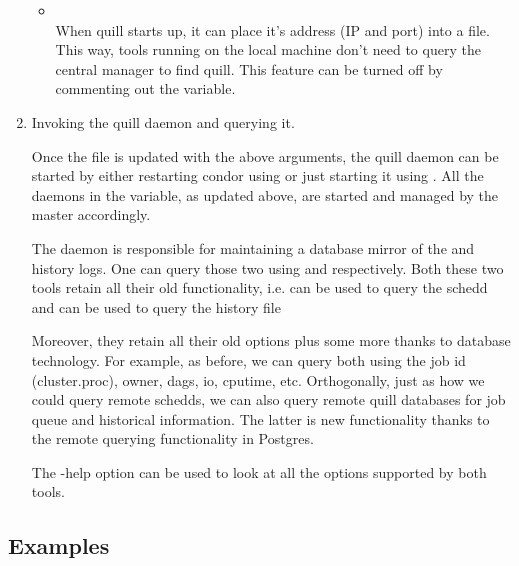 \begin{enumerate}
\begin{itemize}
\item {}\\
When quill starts up, it can place it's address (IP and port)
into a file.  This way, tools running on the local machine don't
need to query the central manager to find quill.  This 
feature can be turned off by commenting out the variable.

\end{itemize}

\item Invoking the quill daemon and querying it.

Once the  file is updated with the above arguments,
the quill daemon can be started by either restarting condor using
 or just starting it using .  All the
daemons in the  variable, as updated above, are
started and managed by the master accordingly.

The  daemon is responsible for maintaining a database
mirror of the  and history logs.  One can query those two
using  and  respectively.  Both these two tools
retain all their old functionality, i.e.  can be used to query
the schedd and  can be used to query the history file

Moreover, they retain all their old options plus some more thanks to
database technology.  For example, as before, we can query both using
the job id (cluster.proc), owner, dags, io, cputime, etc.  Orthogonally,
just as how we could query remote schedds, we can also query remote quill
databases for job queue and historical information.  The latter is new
functionality thanks to the remote querying functionality in Postgres.

The -help option can be used to look at all the options supported by
both tools.
\end{enumerate}


\subsection{\label{sec:Quill-Example}Examples}


